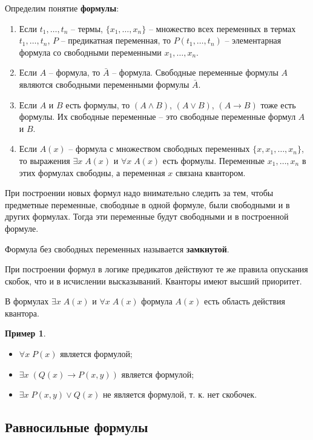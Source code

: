 \documentclass[a5paper, 11pt]{extarticle}
\theoremstyle{definition}
\newtheorem*{example*}{Пример}
\theoremstyle{definition}
\theoremstyle{definition}
\numberwithin{figure}{section}
\numberwithin{table}{section}
\newcommand{\newpar}{$ $\par\nobreak\ignorespaces}
\begin{document}
\noindent Определим понятие \textbf{формулы}:
\begin{enumerate}
    \item Если \(t_1, \ldots, t_n\) -- термы, \(\{x_1, \ldots, x_n\}\) -- множество всех переменных в термах \(t_1, \ldots, t_n\), \(P\) -- предикатная переменная, то \(P(t_1, \ldots, t_n)\) -- элементарная формула со свободными переменными \(x_1, \ldots, x_n\).
    \item Если \(A\) -- формула, то \(\bar{A}\) -- формула. Свободные переменные формулы \(A\) являются свободными переменными формулы \(\bar{A}\).
    \item Если \(A\) и \(B\) есть формулы, то \((A \land B)\), \((A \lor B)\), \((A \to B)\) тоже есть формулы. Их свободные переменные -- это свободные переменные формул \(A\) и \(B\).
    \item Если \(A(x)\) -- формула с множеством свободных переменных \(\{x, x_1, \ldots, x_n\}\), то выражения \(\exists x \; A(x)\) и \(\forall x \; A(x)\) есть формулы. Переменные \(x_1, \ldots, x_n\) в этих формулах свободны, а переменная \(x\) связана квантором.
\end{enumerate}

При построении новых формул надо внимательно следить за тем, чтобы предметные переменные, свободные в одной формуле, были свободными и в других формулах. Тогда эти переменные будут свободными и в построенной формуле.

Формула без свободных переменных называется \textbf{замкнутой}.

При построении формул в логике предикатов действуют те же правила опускания скобок, что и в исчислении высказываний. Кванторы имеют высший приоритет.

В формулах \(\exists x \; A(x)\) и \(\forall x \; A(x)\) формула \(A(x)\) есть область действия квантора.

\begin{example*}
    \newpar
    \begin{itemize}
        \item \(\forall x \; P(x)\) является формулой;
        \item \(\exists x \; (Q(x) \to P(x, y))\) является формулой;
        \item \(\exists x \; P(x, y) \lor Q(x)\) не является формулой, т. к. нет скобочек.
    \end{itemize}
\end{example*}

\subsection{Равносильные формулы}
\end{document}
